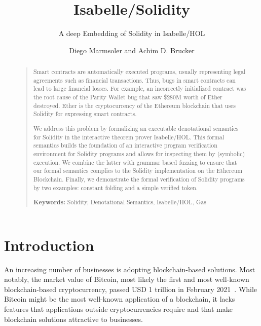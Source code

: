 \documentclass[10pt,DIV17,a4paper,abstract=true,twoside=semi,openright]
{scrreprt}
\title{Isabelle/Solidity}
\subtitle{A deep Embedding of Solidity in Isabelle/HOL}
\author{Diego Marmsoler\textsuperscript{\orcidlink{0000-0003-2859-7673}}  
        and 
        Achim D. Brucker\textsuperscript{\orcidlink{0000-0002-6355-1200}}}%
\newenvironment{frontmatter}{}{}
\begin{document}
\begin{frontmatter}
\maketitle
\begin{abstract}
  \begin{quote}
    Smart contracts are automatically executed programs, usually representing
    legal agreements such as financial transactions. Thus, bugs in smart
    contracts can lead to large financial losses. For example, an incorrectly
    initialized contract was the root cause of the Parity Wallet bug that saw
    \$280M worth of Ether destroyed. Ether is the cryptocurrency of the
    Ethereum blockchain that uses Solidity for expressing smart contracts.

    We address this problem by formalizing an executable denotational semantics
    for Solidity in the interactive theorem prover Isabelle/HOL.  This formal
    semantics builds the foundation of an interactive program verification
    environment for Solidity programs and allows for inspecting them by
    (symbolic) execution. We combine the latter with grammar based fuzzing to
    ensure that our formal semantics complies to the Solidity implementation on
    the Ethereum Blockchain.  Finally, we demonstrate the formal verification of
    Solidity programs by two examples: constant folding and a simple verified
    token.

      \bigskip
      \noindent\textbf{Keywords:} {Solidity, Denotational Semantics,
          Isabelle/HOL, Gas} 
  \end{quote}
\end{abstract}

\tableofcontents
\cleardoublepage
\end{frontmatter}


\chapter{Introduction}
An increasing number of businesses is adopting blockchain-based solutions. Most
notably, the market value of Bitcoin, most likely the first and most well-known
blockchain-based cryptocurrency, passed USD 1 trillion in February
2021~\cite{coinmarket}. While Bitcoin might be the most well-known application
of a blockchain, it lacks features that applications outside cryptocurrencies
require and that make blockchain solutions attractive to businesses.
\end{document}
